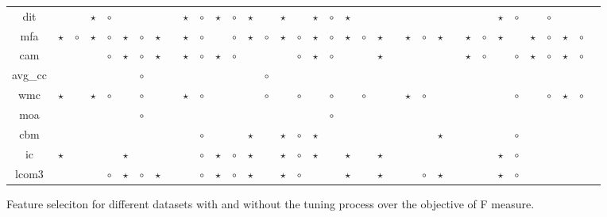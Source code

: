 \documentclass{acm_proc_article-sp}
\begin{document}
\begin{figure*}[!ht]
{\begin{tabular}{c|c c|c c|c c|c c|c c|c c|c c|c c|c c|c c|c c|c c|c c|c c|c c|c c|c c|c }
dit& & & $\star$& $\circ$& & & & & $\star$& $\circ$& $\star$& $\circ$& $\star$& & $\star$& & $\star$& $\circ$& $\star$& & & & & & & & & & $\star$& $\circ$& & $\circ$& & \\
mfa& $\star$& $\circ$& $\star$& $\circ$& $\star$& $\circ$& $\star$& & $\star$& $\circ$& & $\circ$& $\star$& $\circ$& $\star$& $\circ$& $\star$& $\circ$& $\star$& $\circ$& $\star$& & $\star$& $\circ$& $\star$& & $\star$& $\circ$& $\star$& & $\star$& $\circ$& $\star$& $\circ$\\
cam& & & & $\circ$& $\star$& $\circ$& $\star$& & $\star$& $\circ$& $\star$& $\circ$& & & & $\circ$& $\star$& $\circ$& & & $\star$& & & & & & $\star$& $\circ$& & $\circ$& $\star$& $\circ$& $\star$& $\circ$\\
avg\_cc& & & & & & $\circ$& & & & & & & & $\circ$& & & & & & & & & & & & & & & & & & & & \\
wmc& $\star$& & $\star$& $\circ$& & $\circ$& & & $\star$& $\circ$& & & & $\circ$& & $\circ$& & $\circ$& & $\circ$& & & $\star$& $\circ$& & & & & & $\circ$& & $\circ$& $\star$& $\circ$\\
moa& & & & & & $\circ$& & & & & & & & & & & & $\circ$& & & & & & & & & & & & & & & & \\
cbm& & & & & & & & & & $\circ$& & & $\star$& & $\star$& $\circ$& $\star$& & & & & & & & $\star$& & & & & $\circ$& & & & \\
ic& $\star$& & & & $\star$& & & & & $\circ$& $\star$& $\circ$& $\star$& & $\star$& $\circ$& $\star$& & $\star$& & $\star$& & & & & & & & $\star$& $\circ$& & & & \\
lcom3& & & & $\circ$& $\star$& $\circ$& $\star$& & & $\circ$& $\star$& $\circ$& $\star$& & $\star$& $\circ$& & & $\star$& & $\star$& & & $\circ$& $\star$& & & & $\star$& $\circ$& & & & \\

  \end{tabular}}
    \caption{Feature seleciton for different datasets with and without the tuning process over the objective of F measure. }
\end{figure*}
\end{document}
